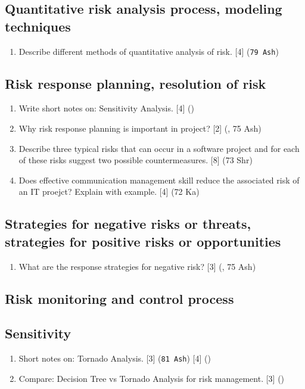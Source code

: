 \documentclass[12pt]{article}
\begin{document}
  \subsection{Quantitative risk analysis process, modeling techniques}
    \begin{enumerate}
      \item Describe different methods of quantitative analysis of risk. \hfill [4] (\texttt{79 Ash})
    \end{enumerate}

  \subsection{Risk response planning, resolution of risk}
    \begin{enumerate}
      \item Write short notes on: Sensitivity Analysis. \hfill [4] ()
        
      \item Why risk response planning is important in project? \hfill [2] (, 75 Ash)

      \item Describe three typical risks that can occur in a software project and for each of these risks suggest two possible countermeasures. \hfill [8] (73 Shr)

      \item Does effective communication management skill reduce the associated risk of an IT proejct? Explain with example. \hfill [4] (72 Ka)
    \end{enumerate}

  \subsection{Strategies for negative risks or threats, strategies for positive risks or opportunities}
    \begin{enumerate}
      \item What are the response strategies for negative risk? \hfill [3] (, 75 Ash)
    \end{enumerate}

  \subsection{Risk monitoring and control process}
  \subsection{Sensitivity}
    \begin{enumerate}
      \item Short notes on: Tornado Analysis. \hfill [3] (\texttt{81 Ash}) [4] ()

      \item Compare: Decision Tree vs Tornado Analysis for risk management. \hfill [3] ()
    \end{enumerate}
\pagebreak
\end{document}
